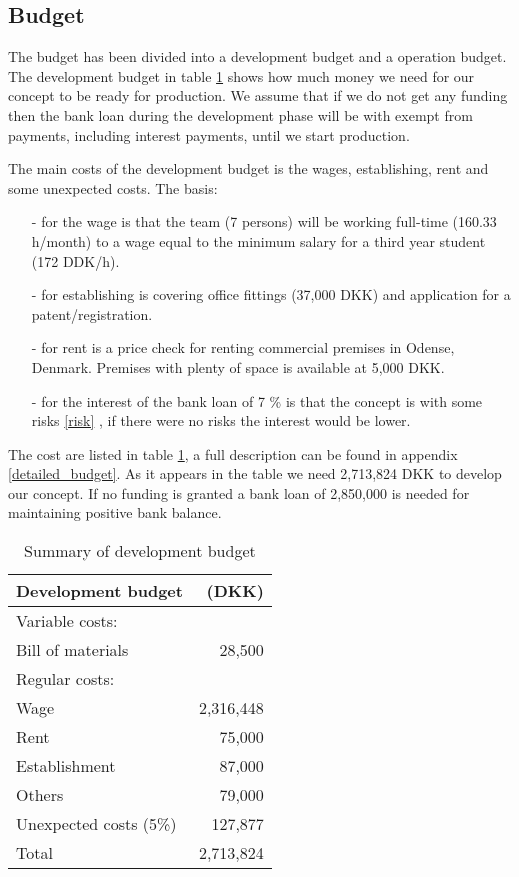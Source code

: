 \subsection{Budget}
\label{budget_label}
The budget has been divided into a development budget and a operation budget. 
The development budget in table \ref{devbud} shows how much money we need for our concept to be ready for production. 
We assume that if we do not get any funding then the bank loan during the development phase will be with exempt from payments, including interest payments, until we start production. 

The main costs of the development budget is the wages, establishing, rent and some unexpected costs. 
The basis: \begin{itemize}
\item[-] for the wage is that the team (7 persons) will be working full-time (160.33 h/month) to a wage equal to the minimum salary for a third year student (172 DDK/h\cite{ida-salary}).
\item[-] for establishing is covering office fittings (37,000 DKK) and application for a patent/registration.
\item[-] for rent is a price check for renting commercial premises in Odense, Denmark. Premises with plenty of space is available at 5,000 DKK.\cite{rent_prices}
\item[-] for the interest of the bank loan of 7 \% is that the concept is with some risks \ref{risk} , if there were no risks the interest would be lower. 
\end{itemize} 
The cost are listed in table \ref{devbud}, a full description can be found in appendix \ref{detailed_budget}. 
As it appears in the table we need 2,713,824 DKK to develop our concept. 
If no funding is granted a bank loan of 2,850,000 is needed for maintaining positive bank balance.

\begin{table}[h!]
\centering
\begin{tabular}{l r}
Development budget      & (DKK)              \\
\hline                                       
Variable costs:         &                    \\
Bill of materials       &    28,500        \\
Regular costs:          &                           \\
Wage                    &    2,316,448           \\
Rent                    &    75,000          \\
Establishment           &    87,000          \\
Others                  &    79,000          \\
Unexpected costs (5\%)  &    127,877         \\
\hline                      
Total                   &    2,713,824           \\
\end{tabular}
\caption{Summary of development budget}
\label{devbud}
\end{table}


